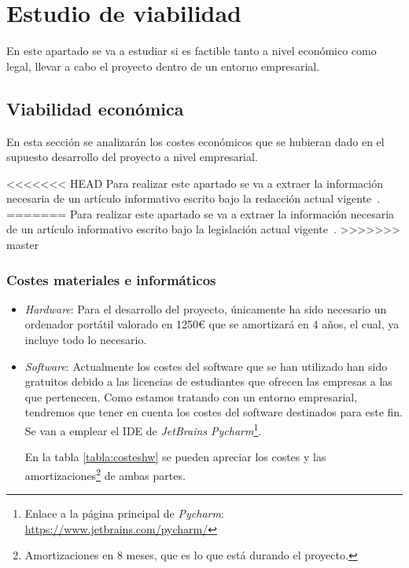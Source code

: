 \section{Estudio de viabilidad}
En este apartado se va a estudiar si es factible tanto a nivel económico como legal, llevar a cabo el proyecto dentro de un entorno empresarial.

\subsection{Viabilidad económica}
En esta sección se analizarán los costes económicos que se hubieran dado en el supuesto desarrollo del proyecto a nivel empresarial.

<<<<<<< HEAD
Para realizar este apartado se va a extraer la información necesaria de un artículo informativo escrito bajo la redacción actual vigente~\cite{cotizacion}.
=======
Para realizar este apartado se va a extraer la información necesaria de un artículo informativo escrito bajo la legislación actual vigente~\cite{cotizacion}.
>>>>>>> master

 
\subsubsection{Costes materiales e informáticos}

\begin{itemize}
	\item \textit{Hardware}: Para el desarrollo del proyecto, únicamente ha sido necesario un ordenador portátil valorado en 1250\euro{} que se amortizará en 4 años, el cual, ya incluye todo lo necesario. 
	
	\item \textit{Software}: Actualmente los costes del software que se han utilizado han sido gratuitos debido a las licencias de estudiantes que ofrecen las empresas a las que pertenecen. Como estamos tratando con un entorno empresarial, tendremos que tener en cuenta los costes del software destinados para este fin.
	Se van a emplear el IDE de \textit{JetBrains Pycharm}\footnote{Enlace a la página principal de \textit{Pycharm}: \url{https://www.jetbrains.com/pycharm/}}.
	
	En la tabla \ref{tabla:costeshw} se pueden apreciar los costes y las amortizaciones\footnote{Amortizaciones en 8 meses, que es lo que está durando el proyecto.} de ambas partes. 
\end{itemize}

